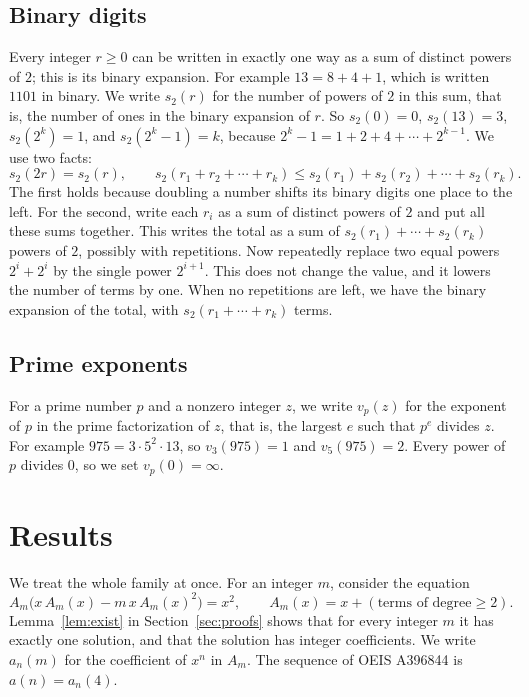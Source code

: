 \documentclass[11pt,a4paper]{article}
\theoremstyle{definition}
\theoremstyle{remark}
\begin{document}
\subsection{Binary digits}
Every integer $r\ge0$ can be written in exactly one way as a sum of distinct powers of $2$; this is its binary
expansion. For example $13=8+4+1$, which is written $1101$ in binary. We write $s_2(r)$ for the number of powers of $2$
in this sum, that is, the number of ones in the binary expansion of $r$. So $s_2(0)=0$, $s_2(13)=3$, $s_2(2^k)=1$, and
$s_2(2^k-1)=k$, because $2^k-1=1+2+4+\cdots+2^{k-1}$. We use two facts:
\begin{equation}\label{eq:digits}
s_2(2r)=s_2(r),\qquad s_2(r_1+r_2+\cdots+r_k)\le s_2(r_1)+s_2(r_2)+\cdots+s_2(r_k).
\end{equation}
The first holds because doubling a number shifts its binary digits one place to the left. For the second, write each
$r_i$ as a sum of distinct powers of $2$ and put all these sums together. This writes the total as a sum of
$s_2(r_1)+\cdots+s_2(r_k)$ powers of $2$, possibly with repetitions. Now repeatedly replace two equal powers
$2^i+2^i$ by the single power $2^{i+1}$. This does not change the value, and it lowers the number of terms by one.
When no repetitions are left, we have the binary expansion of the total, with $s_2(r_1+\cdots+r_k)$ terms.

\subsection{Prime exponents}
For a prime number $p$ and a nonzero integer $z$, we write $v_p(z)$ for the exponent of $p$ in the prime factorization
of $z$, that is, the largest $e$ such that $p^e$ divides $z$. For example $975=3\cdot5^2\cdot13$, so $v_3(975)=1$ and
$v_5(975)=2$. Every power of $p$ divides $0$, so we set $v_p(0)=\infty$.

\section{Results}\label{sec:results}

We treat the whole family at once. For an integer $m$, consider the equation
\begin{equation}\label{eq:general}
A_m\bigl(x\,A_m(x)-m\,x\,A_m(x)^2\bigr)=x^2,\qquad A_m(x)=x+(\text{terms of degree}\ge2).
\end{equation}
Lemma~\ref{lem:exist} in Section~\ref{sec:proofs} shows that for every integer $m$ it has exactly one solution, and
that the solution has integer coefficients. We write $a_n(m)$ for the coefficient of $x^n$ in $A_m$. The sequence of
OEIS A396844 is $a(n)=a_n(4)$.
\end{document}
